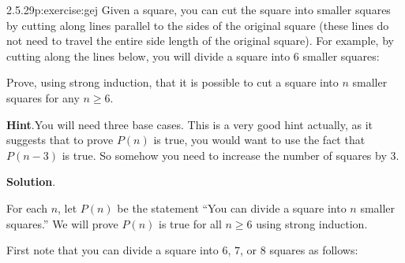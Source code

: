 \documentclass[twoside,11pt,]{book}
\newcommand{\blocktitlefont}{\relax}
\numberwithin{equation}{chapter}
\begin{document}
\begin{divisionsolution}{2.5.29}{}{p:exercise:gej}%
Given a square, you can cut the square into smaller squares by cutting along lines parallel to the sides of the original square (these lines do not need to travel the entire side length of the original square). For example, by cutting along the lines below, you will divide a square into 6 smaller squares:%
\begin{sidebyside}{1}{0.325}{0.325}{0}%
\begin{sbspanel}{0.35}%
%
\end{sbspanel}%
\end{sidebyside}%
\par
Prove, using strong induction, that it is possible to cut a square into \(n\) smaller squares for any \(n \ge 6\).%
\par\smallskip%
\noindent\textbf{\blocktitlefont Hint}.\quad{}You will need three base cases.  This is a very good hint actually, as it suggests that to prove \(P(n)\) is true, you would want to use the fact that \(P(n-3)\) is true.  So somehow you need to increase the number of squares by 3.%
\par\smallskip%
\noindent\textbf{\blocktitlefont Solution}.\quad{}\begin{solutionproof}
For each \(n\), let \(P(n)\) be the statement ``You can divide a square into \(n\) smaller squares.'' We will prove \(P(n)\) is true for all \(n \ge 6\) using strong induction.%
\par
First note that you can divide a square into \(6\), \(7\), or \(8\) squares as follows:%
\begin{sidebyside}{3}{0.0166666666666667}{0.0166666666666667}{0.0333333333333333}%
\begin{sbspanel}{0.3}%
%
\end{sbspanel}%
\begin{sbspanel}{0.3}%
\end{sbspanel}
\end{sidebyside}
\end{solutionproof}
\end{divisionsolution}
\end{document}
